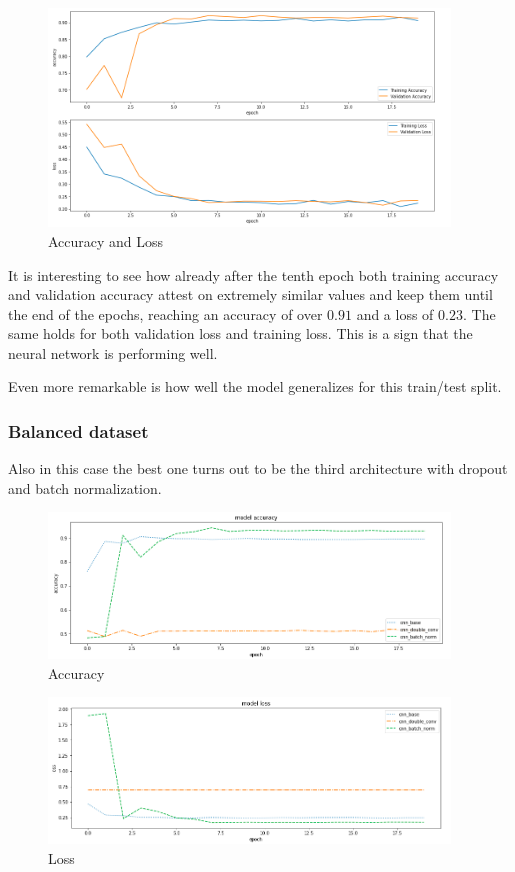 \documentclass{article}
\begin{document}
\begin{figure}[h]
    \centering
    \includegraphics[width=0.95\textwidth]{images/validation_unbalance.png}
    \caption{Accuracy and Loss}
    \label{fig:acc_loss_unb}
\end{figure}

It is interesting to see how already after the tenth epoch both training accuracy and  validation accuracy attest on extremely similar values and keep them until the end of the epochs, reaching an accuracy of over $0.91$ and a loss of $0.23$. The same holds for both validation loss and training loss. This is a sign that the neural network is performing well. 

Even more remarkable is how well the model generalizes for this train/test split.

\subsubsection{Balanced dataset}
Also in this case the best one turns out to be the third architecture with dropout and batch normalization.

\begin{figure}[H]
    \centering
    \includegraphics[width=0.95\textwidth]{images/accuracy_balance.png}
    \caption{Accuracy}
    \label{fig:acc_bal}
\end{figure}

\begin{figure}[H]
    \centering
    \includegraphics[width=0.95\textwidth]{images/loss_balance.png}
    \caption{Loss}
    \label{fig:loss_bal}
\end{figure}
\end{document}
